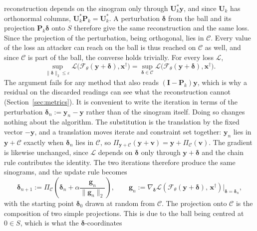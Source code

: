\documentclass{article}
\numberwithin{equation}{section}
\begin{document}
reconstruction depends on the sinogram only through $\mathbf{U}_k^{*}\mathbf{y}$, and since $\mathbf{U}_k$ has
orthonormal columns, $\mathbf{U}_k^{*}\mathbf{P}_k=\mathbf{U}_k^{*}$. A perturbation $\boldsymbol{\delta}$ from
the ball and its projection $\mathbf{P}_k\boldsymbol{\delta}$ onto $S$ therefore give the same reconstruction
and the same loss. Since the projection of the perturbation, being orthogonal, lies in
$\mathcal{C}$. Every value of the loss an attacker can reach on the ball is thus reached on $\mathcal{C}$ as
well, and since $\mathcal{C}$ is part of the ball, the converse holds trivially. For every loss $\mathcal{L}$,
\begin{equation}\label{eq:restrict}
\sup_{\lVert\boldsymbol{\delta}\rVert_2\leq\varepsilon}\mathcal{L}\bigl(\mathcal{F}_\theta(\mathbf{y}+\boldsymbol{\delta}),\mathbf{x}^\dagger\bigr)
=\sup_{\boldsymbol{\delta}\in\mathcal{C}}\mathcal{L}\bigl(\mathcal{F}_\theta(\mathbf{y}+\boldsymbol{\delta}),\mathbf{x}^\dagger\bigr).
\end{equation}
The argument fails for any method that also reads $(\mathbf{I}-\mathbf{P}_k)\mathbf{y}$, which is why a
residual on the discarded readings can see what the reconstruction cannot (Section~\ref{sec:metrics}).
It is convenient to write
the iteration in terms of the perturbation $\boldsymbol{\delta}_n:=\mathbf{y}_n-\mathbf{y}$ rather
than of the sinogram itself. 
Doing so changes nothing about the algorithm. The substitution is
the translation by the fixed vector $-\mathbf{y}$, and a translation moves iterate and constraint
set together: $\mathbf{y}_n$ lies in $\mathbf{y}+\mathcal{C}$ exactly when
$\boldsymbol{\delta}_n$ lies in $\mathcal{C}$, so
$\Pi_{\mathbf{y}+\mathcal{C}}(\mathbf{y}+\mathbf{v})=\mathbf{y}+\Pi_{\mathcal{C}}(\mathbf{v})$.
The gradient is likewise unchanged, since $\mathcal{L}$ depends on $\boldsymbol{\delta}$ only
through $\mathbf{y}+\boldsymbol{\delta}$ and the chain rule contributes the identity. The two
iterations therefore produce the same sinograms, and the update rule becomes
\[\boldsymbol{\delta}_{n+1}:=\Pi_{\mathcal{C}}\left( \boldsymbol{\delta}_n+\alpha\frac{\mathbf{g}_n}{\lVert\mathbf{g}_n\rVert_2}\right),\qquad \mathbf{g}_n:=\nabla_{\boldsymbol{\delta}}\mathcal{L}\!\left(\mathcal{F}_\theta(\mathbf{y}+\boldsymbol{\delta}),\,\mathbf{x}^\dagger\right)\Big|_{\boldsymbol{\delta}=\boldsymbol{\delta}_n},\]
with the starting point $\boldsymbol{\delta}_0$ drawn at random from $\mathcal{C}$. The projection onto
$\mathcal{C}$ is the composition of two simple projections.
This is due to the ball being centred at $0\in S$, which is what the $\boldsymbol{\delta}$-coordinates
\end{document}
